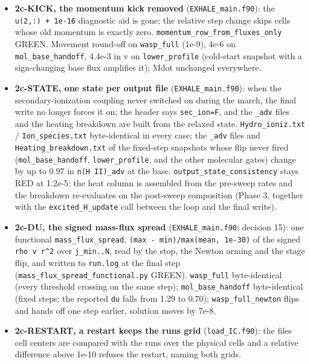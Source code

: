 \documentclass[english,a4paper]{my_memo}
\begin{document}
\begin{itemize}
  stellar lines).
\item
  \textbf{2c-KICK, the momentum kick removed} (\texttt{EXHALE\_main.f90}): the
  \texttt{u(2,:)\ +\ 1e-16} diagnostic aid is gone; the relative step change skips
  cells whose old momentum is exactly zero. \texttt{momentum\_row\_from\_fluxes\_only}
  GREEN. Movement round-off on \texttt{wasp\_full} (1e-9), 4e-6 on
  \texttt{mol\_base\_handoff}, 4.4e-3 in v on \texttt{lower\_profile} (cold-start snapshot
  with a sign-changing base flux amplifies it); Mdot unchanged everywhere.
\item
  \textbf{2c-STATE, one state per output file} (\texttt{EXHALE\_main.f90}): when the
  secondary-ionization coupling never switched on during the march, the
  final write no longer forces it on; the header says \texttt{sec\_ion=F}, and the
  \texttt{\_adv} files and the heating breakdown are built from the relaxed state.
  \texttt{Hydro\_ioniz.txt} / \texttt{Ion\_species.txt} byte-identical in every case; the
  \texttt{\_adv} files and \texttt{Heating\_breakdown.txt} of the fixed-step snapshots whose
  flip never fired (\texttt{mol\_base\_handoff}, \texttt{lower\_profile}, and the other
  molecular gates) change by up to 0.97 in \texttt{n(H\ II)\_adv} at the base.
  \texttt{output\_state\_consistency} stays RED at 1.2e-5: the heat column is
  assembled from the pre-sweep rates and the breakdown re-evaluates on the
  post-sweep composition (Phase 3, together with the \texttt{excited\_H\_update}
  call between the loop and the final write).
\item
  \textbf{2c-DU, the signed mass-flux spread} (\texttt{EXHALE\_main.f90}; decision 15):
  one functional \texttt{mass\_flux\_spread}, \texttt{(max\ -\ min)/max(\textbar{}mean\textbar{},\ 1e-30)} of the
  signed \texttt{rho\ v\ r\^{}2} over \texttt{j\_min..N}, read by the stop, the Newton arming
  and the stage flip, and written to \texttt{run.log} at the final step
  (\texttt{mass\_flux\_spread\_functional.py} GREEN). \texttt{wasp\_full} byte-identical
  (every threshold crossing on the same step); \texttt{mol\_base\_handoff}
  byte-identical (fixed steps; the reported \texttt{du} falls from 1.29 to 0.70);
  \texttt{wasp\_full\_newton} flips and hands off one step earlier, solution moves
  by 7e-8.
\item
  \textbf{2c-RESTART, a restart keeps the run\textquotesingle s grid} (\texttt{load\_IC.f90}): the file\textquotesingle s
  cell centers are compared with the run\textquotesingle s over the physical cells and a
  relative difference above 1e-10 refuses the restart, naming both grids.

\end{itemize}
\end{document}
